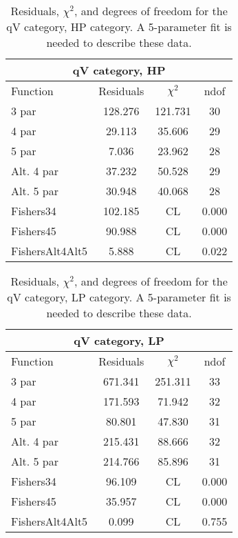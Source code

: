 \begin{table}[htb]
\centering
\begin{tabular}{|l c c c |}
\hline
\multicolumn{4}{|c|}{qV category, HP}\\
\hline
Function & Residuals & $\chi^2$ & ndof \\
\hline
3 par & 128.276 & 121.731 & 30 \\
4 par & 29.113 & 35.606 & 29 \\
5 par & 7.036 & 23.962 & 28 \\
Alt. 4 par& 37.232 & 50.528 & 29 \\
Alt. 5 par& 30.948 & 40.068 & 28 \\
\hline
\hline
Fishers34  & 102.185 & CL & 0.000\\
Fishers45  & 90.988 & CL & 0.000\\
FishersAlt4Alt5  & 5.888 & CL & 0.022\\
\hline
\end{tabular}
\caption{Residuals, $\chi^{2}$, and degrees of freedom for the qV category, HP category. A 5-parameter fit is needed to describe these data.}
\label{tab:qV category, HP}
\end{table}
\begin{table}[htb]
\centering
\begin{tabular}{|l c c c |}
\hline
\multicolumn{4}{|c|}{qV category, LP}\\
\hline
Function & Residuals & $\chi^2$ & ndof \\
\hline
3 par & 671.341 & 251.311 & 33 \\
4 par & 171.593 & 71.942 & 32 \\
5 par & 80.801 & 47.830 & 31 \\
Alt. 4 par& 215.431 & 88.666 & 32 \\
Alt. 5 par& 214.766 & 85.896 & 31 \\
\hline
\hline
Fishers34  & 96.109 & CL & 0.000\\
Fishers45  & 35.957 & CL & 0.000\\
FishersAlt4Alt5  & 0.099 & CL & 0.755\\
\hline
\end{tabular}
\caption{Residuals, $\chi^{2}$, and degrees of freedom for the qV category, LP category. A 5-parameter fit is needed to describe these data.}
\label{tab:qV category, LP}
\end{table}

